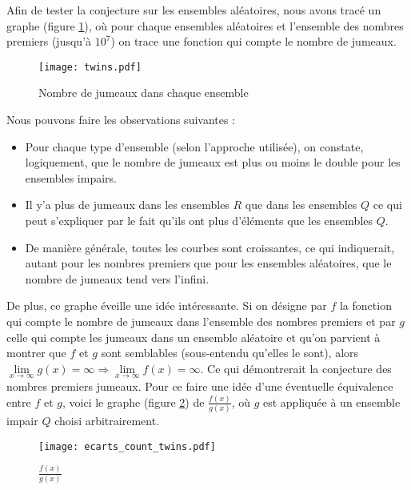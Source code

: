 \documentclass[../main.tex]{subfiles}
\begin{document}
	Afin de tester la conjecture sur les ensembles aléatoires, nous avons tracé un graphe (figure \ref{im:image4}), où pour chaque ensembles aléatoires et l'ensemble des nombres premiers (jusqu'à $10^{7}$) on trace une fonction qui compte le nombre de jumeaux.
\begin{figure}[htbp]
	\centerline{\texttt{[image: twins.pdf]}}
\caption{Nombre de jumeaux dans chaque ensemble }
	\label{im:image4}
\end{figure}
 Nous pouvons faire les observations suivantes : 
 	\begin{itemize}
	\item Pour chaque type d'ensemble (selon l'approche utilisée), on constate, logiquement, que le nombre de jumeaux est plus ou moins le double pour les ensembles impairs.
	\item Il y'a plus de jumeaux dans les ensembles $R$ que dans les ensembles $Q$ ce qui peut s'expliquer par le fait qu'ils ont plus d'éléments que les ensembles $Q$.
	\item De manière générale, toutes les courbes sont croissantes, ce qui indiquerait, autant pour les nombres premiers que pour les ensembles aléatoires, que le nombre de jumeaux tend vers l'infini. 
	\end{itemize}
	
	De plus, ce graphe éveille une idée intéressante. Si on désigne par $f$ la fonction qui compte le nombre de jumeaux dans l'ensemble des nombres premiers et par $g$ celle qui compte les jumeaux dans un ensemble aléatoire et qu'on parvient à montrer que $f$ et $g$ sont semblables (sous-entendu qu'elles le sont), alors $\lim\limits_{x \rightarrow \infty} g(x) = \infty \Rightarrow \lim\limits_{x \rightarrow \infty} f(x) = \infty $. Ce qui démontrerait la conjecture des nombres premiers jumeaux. Pour ce faire une idée d'une éventuelle équivalence entre $f$ et $g$, voici le graphe (figure \ref{im:image6}) de $\frac{f(x)}{g(x)}$, où $g$ est appliquée à un ensemble impair $Q$ choisi arbitrairement. 
	
\begin{figure}[htbp]
	\centerline{\texttt{[image: ecarts\_count\_twins.pdf]}}
\caption{$\frac{f(x)}{g(x)}$}
	\label{im:image6}
\end{figure}

\clearpage
\end{document}
